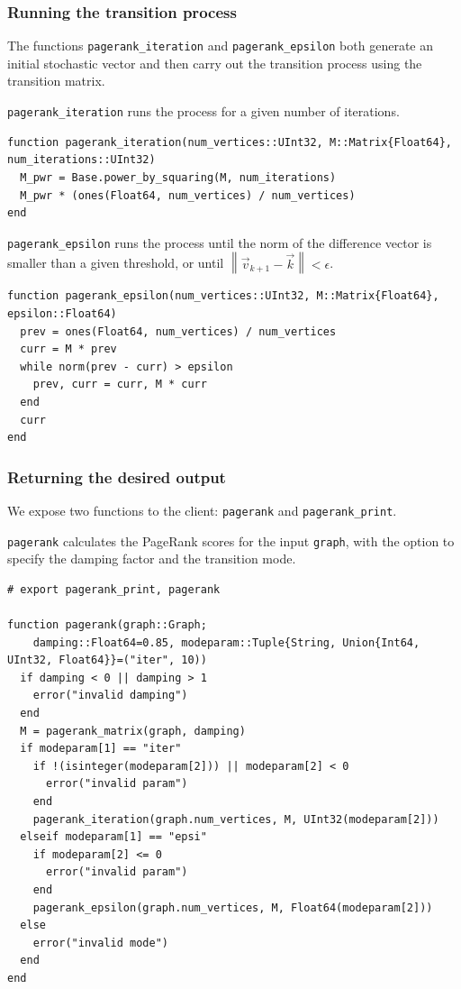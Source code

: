 \documentclass[12pt, titlepage, twoside]{amsart}
\begin{document}
\subsubsection{Running the transition process}

The functions \texttt{pagerank_iteration} and \texttt{pagerank_epsilon} both generate
an initial stochastic vector and then carry out the transition process using the transition matrix.

\texttt{pagerank_iteration} runs the process for a given number of iterations.

\begin{verbatim}
function pagerank_iteration(num_vertices::UInt32, M::Matrix{Float64}, num_iterations::UInt32)
  M_pwr = Base.power_by_squaring(M, num_iterations) 
  M_pwr * (ones(Float64, num_vertices) / num_vertices)
end
\end{verbatim}

\texttt{pagerank_epsilon} runs the process until the norm of the difference vector
is smaller than a given threshold, or until
$\left\lVert\vec{v}_{k + 1} - \vec{k}\right\rVert < \epsilon$.

\begin{verbatim}
function pagerank_epsilon(num_vertices::UInt32, M::Matrix{Float64}, epsilon::Float64)
  prev = ones(Float64, num_vertices) / num_vertices
  curr = M * prev
  while norm(prev - curr) > epsilon
    prev, curr = curr, M * curr
  end
  curr
end
\end{verbatim}

\subsubsection{Returning the desired output}

We expose two functions to the client: \texttt{pagerank} and \texttt{pagerank_print}.

\texttt{pagerank} calculates the PageRank scores for the input \texttt{graph},
with the option to specify the damping factor and the transition mode.

\begin{verbatim}
# export pagerank_print, pagerank

function pagerank(graph::Graph;
    damping::Float64=0.85, modeparam::Tuple{String, Union{Int64, UInt32, Float64}}=("iter", 10))
  if damping < 0 || damping > 1
    error("invalid damping")
  end
  M = pagerank_matrix(graph, damping)
  if modeparam[1] == "iter"
    if !(isinteger(modeparam[2])) || modeparam[2] < 0
      error("invalid param")
    end
    pagerank_iteration(graph.num_vertices, M, UInt32(modeparam[2]))
  elseif modeparam[1] == "epsi"
    if modeparam[2] <= 0
      error("invalid param")
    end
    pagerank_epsilon(graph.num_vertices, M, Float64(modeparam[2]))
  else
    error("invalid mode")
  end
end
\end{verbatim}
\end{document}
